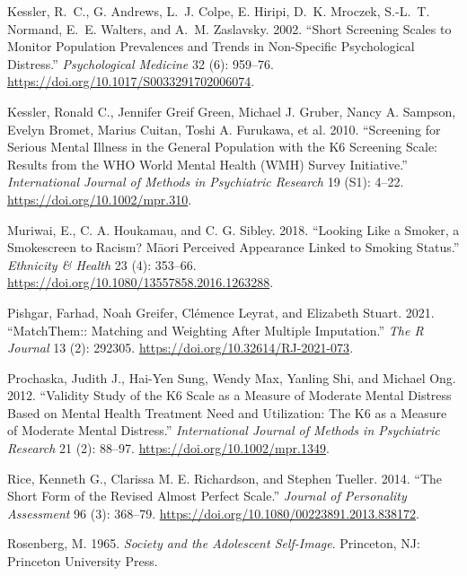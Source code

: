 \documentclass[
  singlecolumn]{report}
\newlength{\cslhangindent}
\newlength{\cslentryspacingunit} %
\newenvironment{CSLReferences}[2] %
 {%
  \setlength{\parindent}{0pt}
  \ifodd #1
  \let\oldpar\par
  \def\par{\hangindent=\cslhangindent\oldpar}
  \fi
  \setlength{\parskip}{#2\cslentryspacingunit}
 }%
 {}
\begin{document}
\begin{CSLReferences}{1}{0}
\leavevmode{}%
Kessler, R.~C., G. Andrews, L.~J. Colpe, E. Hiripi, D.~K. Mroczek,
S.-L.~T. Normand, E.~E. Walters, and A.~M. Zaslavsky. 2002. {``Short
Screening Scales to Monitor Population Prevalences and Trends in
Non-Specific Psychological Distress.''} \emph{Psychological Medicine} 32
(6): 959--76. \url{https://doi.org/10.1017/S0033291702006074}.

\leavevmode{}%
Kessler, Ronald C., Jennifer Greif Green, Michael J. Gruber, Nancy A.
Sampson, Evelyn Bromet, Marius Cuitan, Toshi A. Furukawa, et al. 2010.
{``Screening for Serious Mental Illness in the General Population with
the K6 Screening Scale: Results from the WHO World Mental Health (WMH)
Survey Initiative.''} \emph{International Journal of Methods in
Psychiatric Research} 19 (S1): 4--22.
\url{https://doi.org/10.1002/mpr.310}.

\leavevmode{}%
Muriwai, E., C. A. Houkamau, and C. G. Sibley. 2018. {``Looking Like a
Smoker, a Smokescreen to Racism? Māori Perceived Appearance Linked to
Smoking Status.''} \emph{Ethnicity \& Health} 23 (4): 353--66.
\url{https://doi.org/10.1080/13557858.2016.1263288}.

\leavevmode{}%
Pishgar, Farhad, Noah Greifer, Clémence Leyrat, and Elizabeth Stuart.
2021. {``MatchThem:: Matching and Weighting After Multiple
Imputation.''} \emph{The R Journal} 13 (2): 292305.
\url{https://doi.org/10.32614/RJ-2021-073}.

\leavevmode{}%
Prochaska, Judith J., Hai-Yen Sung, Wendy Max, Yanling Shi, and Michael
Ong. 2012. {``Validity Study of the K6 Scale as a Measure of Moderate
Mental Distress Based on Mental Health Treatment Need and Utilization:
The K6 as a Measure of Moderate Mental Distress.''} \emph{International
Journal of Methods in Psychiatric Research} 21 (2): 88--97.
\url{https://doi.org/10.1002/mpr.1349}.

\leavevmode{}%
Rice, Kenneth G., Clarissa M. E. Richardson, and Stephen Tueller. 2014.
{``The Short Form of the Revised Almost Perfect Scale.''} \emph{Journal
of Personality Assessment} 96 (3): 368--79.
\url{https://doi.org/10.1080/00223891.2013.838172}.

\leavevmode{}%
Rosenberg, M. 1965. \emph{Society and the Adolescent Self-Image}.
Princeton, NJ: Princeton University Press.


\end{CSLReferences}
\end{document}

